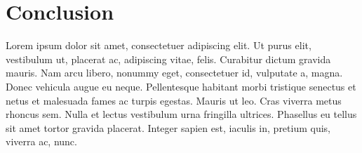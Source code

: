 \documentclass[a4paper]{article}
\theoremstyle{plain}
\begin{document}
\section*{Conclusion}

Lorem ipsum dolor sit amet, consectetuer adipiscing elit. Ut purus elit, vestibulum ut, placerat ac, adipiscing vitae, felis. Curabitur dictum gravida mauris. Nam arcu libero, nonummy eget, consectetuer id, vulputate a, magna. Donec vehicula augue eu neque. Pellentesque habitant morbi tristique senectus et netus et malesuada fames ac turpis egestas. Mauris ut leo. Cras viverra metus rhoncus sem. Nulla et lectus vestibulum urna fringilla ultrices. Phasellus eu tellus sit amet tortor gravida placerat. Integer sapien est, iaculis in, pretium quis, viverra ac, nunc.

\nocite{*}


\end{document}
